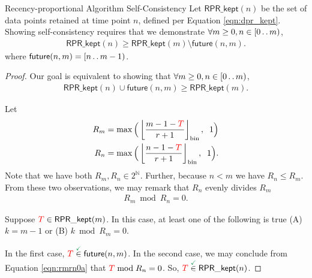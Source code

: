\begin{theorem}{Recency-proportional Algorithm Self-Consistency}
\label{thm:recency-proportional-algo-self-consistency}
Let $\mathsf{RPR\_kept}(n)$ be the set of data points retained at time point $n$, defined per Equation \ref{eqn:dpr_kept}.
Showing self-consistency requires that we demonstrate $\forall m \geq 0, n \in [0 \mathinner {\ldotp \ldotp} m)$,
\begin{align*}
\mathsf{RPR\_kept}(n)
\geq
\mathsf{RPR\_kept}(m)
\setminus
\mathsf{future}(n, m).
\end{align*}
where $\mathsf{future}(n, m) = [n \mathinner {\ldotp \ldotp} m - 1)$.
\end{theorem}

\begin{proof}
\label{prf:recency-proportional-algo-self-consistency}
Our goal is equivalent to showing that $\forall m \geq 0, n \in [0 \mathinner {\ldotp \ldotp} m)$,
\begin{align*}
\mathsf{RPR\_kept}(n) \cup \mathsf{future}(n, m) \geq \mathsf{RPR\_kept}(m).
\end{align*}

Let
\begin{align*}
R_m
&=
\max\Big(\left \lfloor \frac{m  - 1 - \colorTbar}{r + 1} \right \rfloor_{\mathrm{bin}}, \;\; 1\Big)\\
R_n
&=
\max\Big(\left \lfloor \frac{n  - 1 - \colorTbar}{r + 1} \right \rfloor_{\mathrm{bin}}, \;\; 1\Big).
\end{align*}
Note that we have both $R_m, R_n \in 2^{\mathbb{N}}$.
Further, because $n < m$ we have $R_n \leq R_m$.
From these two observations, we may remark that $R_n$ evenly divides $R_m$
\begin{align}
R_m \bmod R_n = 0.
\label{eqn:rmrn0a}
\end{align}

Suppose $\colorTbar \in \mathsf{RPR\_kept}(m)$.
In this case, at least one of the following is true (A) $k = m - 1$ or (B) $k \bmod R_m = 0$.

In the first case, $\colorTbar \stackrel{\checkmark}{\in} \mathsf{future}(n, m)$.
In the second case, we may conclude from Equation \ref{eqn:rmrn0a} that $\colorTbar \bmod R_n = 0$.
So, $\colorTbar \stackrel{\checkmark}{\in} \mathsf{RPR\_kept}(n)$.
\end{proof}
